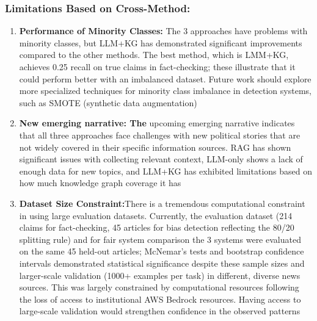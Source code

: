 \documentclass[11pt]{article}
\begin{document}
\subsubsection{Limitations Based on  Cross-Method:}
\begin{enumerate}

\item \textbf{Performance of Minority Classes: }
The 3 approaches have problems with minority classes, but LLM+KG has demonstrated significant improvements compared to the other methods. The best method, which is LMM+KG, achieves 0.25 recall on true claims in fact-checking; these illustrate that it could perform better with an imbalanced dataset. Future work should explore more specialized techniques for minority class imbalance in detection systems, such as SMOTE (synthetic data augmentation)  

\item \textbf{New emerging narrative: The}
 upcoming emerging narrative indicates that all three approaches face challenges with new political stories that are not widely covered in their specific information sources. RAG has shown significant issues with collecting relevant context, LLM-only shows a lack of enough data for new topics, and LLM+KG has exhibited limitations based on how much knowledge graph coverage it has

 \item \textbf{Dataset Size Constraint:}There is a tremendous computational constraint in using large evaluation datasets. Currently, the evaluation dataset (214 claims for fact-checking, 45 articles for bias detection reflecting the 80/20 splitting rule) and for fair system comparison the 3 systems were evaluated on the same 45 held-out articles; McNemar's tests and bootstrap confidence intervals demonstrated statistical significance despite these sample sizes and larger-scale validation (1000+ examples per task) in different, diverse news sources. This was largely constrained by computational resources following the loss of access to institutional AWS Bedrock resources. Having access to large-scale validation would strengthen confidence in the observed patterns

 \end{enumerate}
\end{document}
